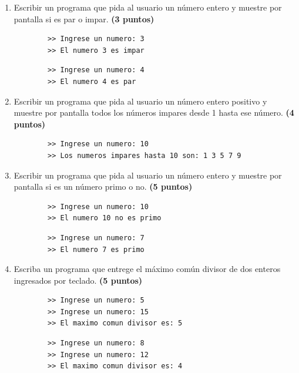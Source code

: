 \documentclass{article}
\begin{document}
	\begin{enumerate}
		\item Escribir un programa que pida al usuario un número entero y muestre por pantalla si es par o impar. \textbf{(3 puntos)}
		
		\begin{lstlisting}
		>> Ingrese un numero: 3
		>> El numero 3 es impar		
		\end{lstlisting}
		
		\begin{lstlisting}
		>> Ingrese un numero: 4
		>> El numero 4 es par		
		\end{lstlisting}
		
		\item Escribir un programa que pida al usuario un número entero positivo y muestre por pantalla todos los números impares desde 1 hasta ese número. \textbf{(4 puntos)}
		
		\begin{lstlisting}
		>> Ingrese un numero: 10
		>> Los numeros impares hasta 10 son: 1 3 5 7 9	
		\end{lstlisting}
		
		\item Escribir un programa que pida al usuario un número entero y muestre por pantalla si es un número primo o no. \textbf{(5 puntos)}
		
		\begin{lstlisting}
		>> Ingrese un numero: 10
		>> El numero 10 no es primo	
		\end{lstlisting}
		
		\begin{lstlisting}
		>> Ingrese un numero: 7
		>> El numero 7 es primo	
		\end{lstlisting}
		
		\item Escriba un programa que entrege el máximo común divisor de dos enteros ingresados por teclado. \textbf{(5 puntos)}
				
		\begin{lstlisting}
		>> Ingrese un numero: 5
		>> Ingrese un numero: 15		
		>> El maximo comun divisor es: 5
		\end{lstlisting}
		
		\begin{lstlisting}
		>> Ingrese un numero: 8
		>> Ingrese un numero: 12		
		>> El maximo comun divisor es: 4
		\end{lstlisting}

	\end{enumerate}
\end{document}
